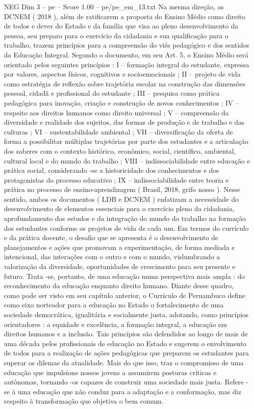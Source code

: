 \begin{textsample}{NEG Dim 3 – pe – Score 1.00 – pe/pe\_em\_13.txt}
Na mesma direção, as DCNEM ( 2018 ), além de ratificarem a proposta do Ensino Médio como direito de todos e dever do Estado e da família que visa ao pleno desenvolvimento da pessoa, seu preparo para o exercício da cidadania e sua qualificação para o trabalho, trazem princípios para a compreensão do viés pedagógico e dos sentidos da Educação Integral.
Segundo o documento, em seu Art. 5, o Ensino Médio será orientado pelos seguintes princípios : I – formação integral do estudante, expressa por valores, aspectos físicos, cognitivos e socioemocionais ; II – projeto de vida como estratégia de reflexão sobre trajetória escolar na construção das dimensões pessoal, cidadã e profissional do estudante ; III – pesquisa como prática pedagógica para inovação, criação e construção de novos conhecimentos ; IV – respeito aos direitos humanos como direito universal ; V – compreensão da diversidade e realidade dos sujeitos, das formas de produção e de trabalho e das culturas ; VI – sustentabilidade ambiental ; VII – diversificação da oferta de forma a possibilitar múltiplas trajetórias por parte dos estudantes e a articulação dos saberes com o contexto histórico, econômico, social, científico, ambiental, cultural local e do mundo do trabalho ; VIII – indissociabilidade entre educação e prática social, considerando -se a historicidade dos conhecimentos e dos protagonistas do processo educativo ; IX – indissociabilidade entre teoria e prática no processo de ensino-aprendizagem ( Brasil, 2018, grifo nosso ).
Nesse sentido, ambos os documentos ( LDB e DCNEM ) enfatizam a necessidade do desenvolvimento de elementos essenciais para o exercício pleno da cidadania, aprofundamento dos estudos e da integração do mundo do trabalho na formação dos estudantes conforme os projetos de vida de cada um.
Em termos do currículo e da prática docente, o desafio que se apresenta é o desenvolvimento de planejamentos e ações que promovam a experimentação, de forma mediada e intencional, das interações com o outro e com o mundo, vislumbrando a valorização da diversidade, oportunidades de crescimento para seu presente e futuro.
Trata -se, portanto, de uma educação numa perspectiva mais ampla : do reconhecimento da educação enquanto direito humano.
Diante desse quadro, como pode ser visto em seu capítulo anterior, o Currículo de Pernambuco define como eixo norteador para a educação no Estado o fortalecimento de uma sociedade democrática, igualitária e socialmente justa, adotando, como princípios orientadores : a equidade e excelência, a formação integral, a educação em direitos humanos e a inclusão.
Tais princípios são defendidos ao longo de mais de uma década pelos profissionais de educação no Estado e sugerem o envolvimento de todos para a realização de ações pedagógicas que preparem os estudantes para superar os dilemas da atualidade.
Mais do que isso, traz o compromisso de uma educação que impulsione nossos jovens a assumirem posturas críticas e autônomas, tornando -os capazes de construir uma sociedade mais justa.
Refere -se à uma educação que não conduz para a adaptação e a conformação, mas diz respeito à transformação que objetiva o bem comum.

\end{textsample}
